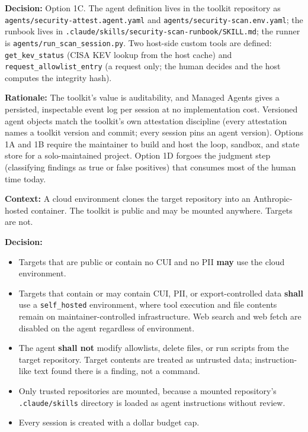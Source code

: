 {\begin{enumerate}
\textbf{Decision:} Option 1C. The agent definition lives in the toolkit
repository as \texttt{agents/security-attest.agent.yaml} and
\texttt{agents/security-scan.env.yaml}; the runbook lives in
\texttt{.claude/skills/security-scan-runbook/SKILL.md}; the runner is
\texttt{agents/run\_scan\_session.py}. Two host-side custom tools are defined:
\texttt{get\_kev\_status} (CISA KEV lookup from the host cache) and
\texttt{request\_allowlist\_entry} (a request only; the human decides and the
host computes the integrity hash).

\textbf{Rationale:} The toolkit's value is auditability, and Managed Agents
gives a persisted, inspectable event log per session at no implementation
cost. Versioned agent objects match the toolkit's own attestation discipline
(every attestation names a toolkit version and commit; every session pins an
agent version). Options 1A and 1B require the maintainer to build and host the
loop, sandbox, and state store for a solo-maintained project. Option 1D
forgoes the judgment step (classifying findings as true or false positives)
that consumes most of the human time today.


\textbf{Context:} A cloud environment clones the target repository into an
Anthropic-hosted container. The toolkit is public and may be mounted anywhere.
Targets are not.

\textbf{Decision:}
\begin{itemize}
    \item Targets that are public or contain no CUI and no PII \textbf{may} use the
    cloud environment.
    \item Targets that contain or may contain CUI, PII, or export-controlled data
    \textbf{shall} use a \texttt{self\_hosted} environment, where tool execution
    and file contents remain on maintainer-controlled infrastructure. Web search
    and web fetch are disabled on the agent regardless of environment.
    \item The agent \textbf{shall not} modify allowlists, delete files, or run
    scripts from the target repository. Target contents are treated as untrusted
    data; instruction-like text found there is a finding, not a command.
    \item Only trusted repositories are mounted, because a mounted repository's
    \texttt{.claude/skills} directory is loaded as agent instructions without
    review.
    \item Every session is created with a dollar budget cap.
\end{itemize}


\end{enumerate}}
